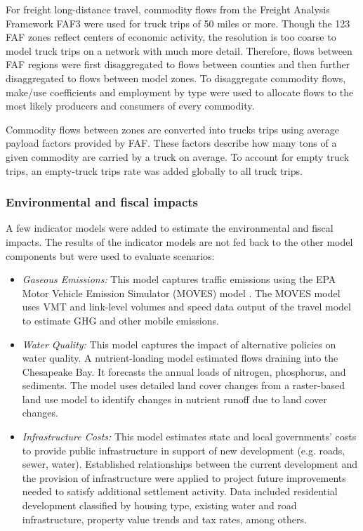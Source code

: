 For freight long-distance travel, commodity flows from the Freight Analysis Framework FAF3 were used for truck trips of 50 miles or more. Though the 123 FAF zones reflect centers of economic activity, the resolution is too coarse to model truck trips on a network with much more detail. Therefore, flows between FAF regions were first disaggregated to flows between counties and then further disaggregated to flows between model zones. To disaggregate commodity flows, make/use coefficients and employment by type were used to allocate flows to the most likely producers and consumers of every commodity.

Commodity flows between zones are converted into trucks trips using average payload factors provided by FAF. These factors describe how many tons of a given commodity are carried by a truck on average. To account for empty truck trips, an empty-truck trips rate was added globally to all truck trips.

\subsubsection{Environmental and fiscal impacts}

A few indicator models were added to estimate the environmental and fiscal impacts. The results of the indicator models are not fed back to the other model components but were used to evaluate scenarios:
\begin{itemize}
\item
\emph{Gaseous Emissions:} This model captures traffic emissions using the EPA Motor Vehicle Emission Simulator (MOVES) model \cite{epamoves16}. The MOVES model uses VMT and link-level volumes and speed data output of the travel model to estimate GHG and other mobile emissions.
\item
\emph{Water Quality:} This model captures the impact of alternative policies on water quality. A nutrient-loading model estimated flows draining into the Chesapeake Bay. It forecasts the annual loads of nitrogen, phosphorus, and sediments. The model uses detailed land cover changes from a raster-based land use model to identify changes in nutrient runoff due to land cover changes.
\item
\emph{Infrastructure Costs:} This model estimates state and local governments' costs to provide public infrastructure in support of new development (e.g. roads, sewer, water). Established relationships between the current development and the provision of infrastructure were applied to project future improvements needed to satisfy additional settlement activity. Data included residential development classified by housing type, existing water and road infrastructure, property value trends and tax rates, among others.
\end{itemize}

